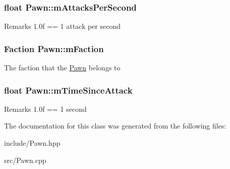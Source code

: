 \subsubsection[{m\+Attacks\+Per\+Second}]{\setlength{\rightskip}{0pt plus 5cm}float Pawn\+::m\+Attacks\+Per\+Second\hspace{0.3cm}{\ttfamily [protected]}}\label{class_pawn_a9daa828974fd50635825e438afe781da}
\begin{DoxyRemark}{Remarks}
1.\+0f == 1 attack per second 
\end{DoxyRemark}
\hypertarget{class_pawn_ad37825a7c274b2418d2e9d9bdd8afbf1}{}
\subsubsection[{m\+Faction}]{\setlength{\rightskip}{0pt plus 5cm}Faction Pawn\+::m\+Faction\hspace{0.3cm}{\ttfamily [protected]}}\label{class_pawn_ad37825a7c274b2418d2e9d9bdd8afbf1}
The faction that the \hyperlink{class_pawn}{Pawn} belongs to \hypertarget{class_pawn_a6ce596a12f726a288259e20fe8623bcb}{}
\subsubsection[{m\+Time\+Since\+Attack}]{\setlength{\rightskip}{0pt plus 5cm}float Pawn\+::m\+Time\+Since\+Attack\hspace{0.3cm}{\ttfamily [protected]}}\label{class_pawn_a6ce596a12f726a288259e20fe8623bcb}
\begin{DoxyRemark}{Remarks}
1.\+0f == 1 second 
\end{DoxyRemark}


The documentation for this class was generated from the following files\+:\begin{DoxyCompactItemize}
\item 
include/Pawn.\+hpp\item 
src/Pawn.\+cpp\end{DoxyCompactItemize}
